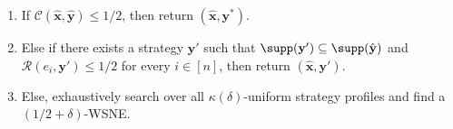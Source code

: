 \begin{algorithm}[H]
\begin{enumerate}[label=\arabic*.,leftmargin=1.8em,itemsep=0.25em,topsep=0.4em]
\begin{enumerate}[label=(\alph*),leftmargin=2.2em,itemsep=0.15em,topsep=0.1em]
        \item If \(\mathcal{C}(\hat{\mathbf{x}},\hat{\mathbf{y}})\leq 1/2\), then return \((\hat{\mathbf{x}},\mathbf{y}^*)\).
        \item Else if there exists a strategy \(\mathbf{y}'\) such that
        \(\supp(\mathbf{y}')\subseteq\supp(\hat{\mathbf{y}})\) and
        \(\mathcal{R}(e_i,\mathbf{y}')\leq 1/2\) for every \(i\in[n]\), then return \((\hat{\mathbf{x}},\mathbf{y}')\).
        \item Else, exhaustively search over all \(\kappa(\delta)\)-uniform strategy profiles and find a \((1/2+\delta)\)-WSNE.
      \end{enumerate}
  \end{enumerate}
\end{algorithm}
